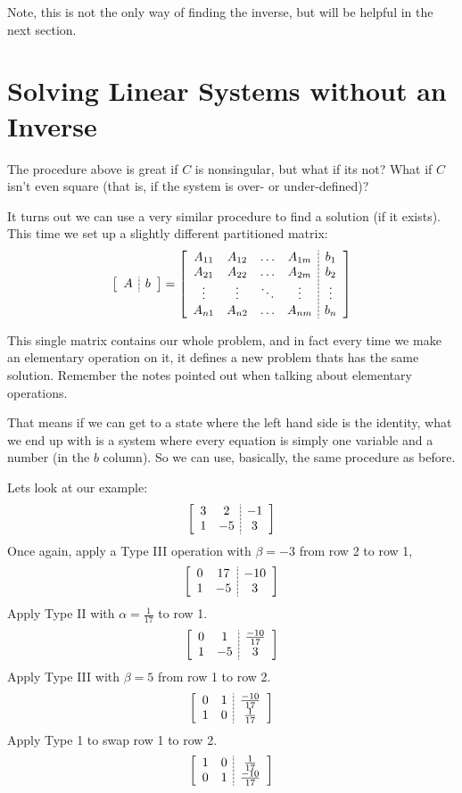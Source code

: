 Note, this is not the only way of finding the inverse, but will be helpful in the next section. 

\section{Solving Linear Systems without an Inverse}
The procedure above is great if $C$ is nonsingular, but what if its not?
What if $C$ isn't even square (that is, if the system is over- or under-defined)?

It turns out we can use a very similar procedure to find a solution (if it exists). 
This time we set up a slightly different partitioned matrix: 
\[
\left[\begin{array}{c;{2pt/1pt}c}A&b\end{array}\right] = 
\left[\begin{array}{cccc;{2pt/1pt}c}
A_{11} & A_{12} & \hdots & A_{1m} & b_1\\
A_{21} & A_{22} & \hdots & A_{2m} & b_2\\
\vdots & \vdots & \ddots & \vdots &\vdots  \\
A_{n1} & A_{n2} & \hdots & A_{nm} & b_n\\
\end{array}\right]
\]

This single matrix contains our whole problem, 
and in fact every time we make an elementary operation on it, 
it defines a new problem thats has the same solution. 
Remember the notes pointed out when talking about elementary operations. 

That means if we can get to a state where the left hand side is the identity,
what we end up with is a system where every equation is simply one variable and a number (in the $b$ column). 
So we can use, basically, the same procedure as before. 

Lets look at our example:
\[\left[\begin{array}{cc;{2pt/1pt}c} 3 & 2 & -1\\ 1 & -5 & 3\end{array}\right]\]
Once again, apply a Type III operation with $\beta=-3$ from row 2 to row 1,
\[\left[\begin{array}{cc;{2pt/1pt}c} 0 & 17 & -10\\ 1 & -5 & 3\end{array}\right]\]
Apply Type II with $\alpha=\frac{1}{17}$ to row 1. 
\[\left[\begin{array}{cc;{2pt/1pt}c} 0 & 1 & \frac{-10}{17}\\ 1 & -5 & 3\end{array}\right]\]
Apply Type III with $\beta=5$ from row 1 to row 2.
\[\left[\begin{array}{cc;{2pt/1pt}c} 0 & 1 & \frac{-10}{17}\\ 1 & 0 & \frac{1}{17}\end{array}\right]\]
Apply Type 1 to swap  row 1 to row 2.
\[\left[\begin{array}{cc;{2pt/1pt}c} 1 & 0 & \frac{1}{17}\\0 & 1 & \frac{-10}{17}\end{array}\right]\]

